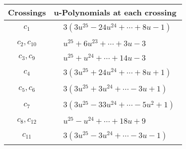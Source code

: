 \documentclass[1p]{elsarticle_modified}
\theoremstyle{definition}
\begin{document}
\begin{tabular}{m{50pt}|m{274pt}}
Crossings & \hspace{64pt}u-Polynomials at each crossing \\
\hline $$\begin{aligned}c_{1}\end{aligned}$$&$\begin{aligned}
&3(3 u^{25}-24 u^{24}+\cdots+8 u-1)
\end{aligned}$\\
\hline $$\begin{aligned}c_{2},c_{10}\end{aligned}$$&$\begin{aligned}
&u^{25}+6 u^{23}+\cdots+3 u-3
\end{aligned}$\\
\hline $$\begin{aligned}c_{3},c_{9}\end{aligned}$$&$\begin{aligned}
&u^{25}+u^{24}+\cdots+14 u-3
\end{aligned}$\\
\hline $$\begin{aligned}c_{4}\end{aligned}$$&$\begin{aligned}
&3(3 u^{25}+24 u^{24}+\cdots+8 u+1)
\end{aligned}$\\
\hline $$\begin{aligned}c_{5},c_{6}\end{aligned}$$&$\begin{aligned}
&3(3 u^{25}+3 u^{24}+\cdots-3 u+1)
\end{aligned}$\\
\hline $$\begin{aligned}c_{7}\end{aligned}$$&$\begin{aligned}
&3(3 u^{25}-33 u^{24}+\cdots-5 u^2+1)
\end{aligned}$\\
\hline $$\begin{aligned}c_{8},c_{12}\end{aligned}$$&$\begin{aligned}
&u^{25}- u^{24}+\cdots+18 u+9
\end{aligned}$\\
\hline $$\begin{aligned}c_{11}\end{aligned}$$&$\begin{aligned}
&3(3 u^{25}-3 u^{24}+\cdots-3 u-1)
\end{aligned}$\\
\hline
\end{tabular}\\~\\
\end{document}
